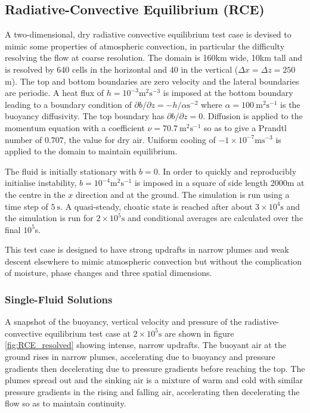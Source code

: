 \documentclass[draft]{agujournal2019}
\begin{document}
\subsection{Radiative-Convective Equilibrium (RCE)}

A two-dimensional, dry radiative convective equilibrium test case
is devised to mimic some properties of atmospheric convection, in
particular the difficulty resolving the flow at coarse resolution.
The domain is 160km wide, 10km tall and is resolved by 640 cells in
the horizontal and 40 in the vertical ($\Delta x=\Delta z=250$m).
The top and bottom boundaries are zero velocity and the lateral boundaries
are periodic. A heat flux of $h=10^{-3}\text{m}^{2}\text{s}^{-3}$
is imposed at the bottom boundary leading to a boundary condition
of $\partial b/\partial z=-h/\alpha\text{s}^{-2}$ where $\alpha=100\ \text{m}^{2}\text{s}^{-1}$
is the buoyancy diffusivity. The top boundary has $\partial b/\partial z=0$.
Diffusion is applied to the momentum equation with a coefficient $\nu=70.7\ \text{m}^{2}\text{s}^{-1}$
so as to give a Prandtl number of $0.707$, the value for dry air. Uniform cooling of $-1\times10^{-7}\text{m}\text{s}^{-3}$ is applied to the domain to maintain equilibrium.

The fluid is initially stationary with $b=0$. In order to quickly
and reproducibly initialise instability, $b=10^{-4}\text{m}^{2}\text{s}^{-1}$
is imposed in a square of side length 2000m at the centre in the $x$
direction and at the ground. The simulation is run using a time step
of $5\ \text{s}$. A quasi-steady, choatic state is reached after
about $3\times10^{4}\text{s}$ and the simulation is run for $2\times10^{5}\text{s}$
and conditional averages are calculated over the final $10^{5}$s.

This test case is designed to have strong updrafts in narrow plumes
and weak descent elsewhere to mimic atmospheric convection but without
the complication of moisture, phase changes and three spatial dimensions.

\subsubsection{Single-Fluid Solutions}

A snapshot of the buoyancy, vertical velocity and pressure of the
radiative-convective equilibrium test case at $2\times10^{5}\text{s}$
are shown in figure \ref{fig:RCE_resolved} showing intense, narrow
updrafts. The buoyant air at the ground rises in narrow plumes,
accelerating due to buoyancy and pressure gradients then decelerating
due to pressure gradients before reaching the top. The plumes spread
out and the sinking air is a mixture of warm and cold with similar
pressure gradients in the rising and falling air, accelerating then
decelerating the flow so as to maintain continuity. 
\end{document}
